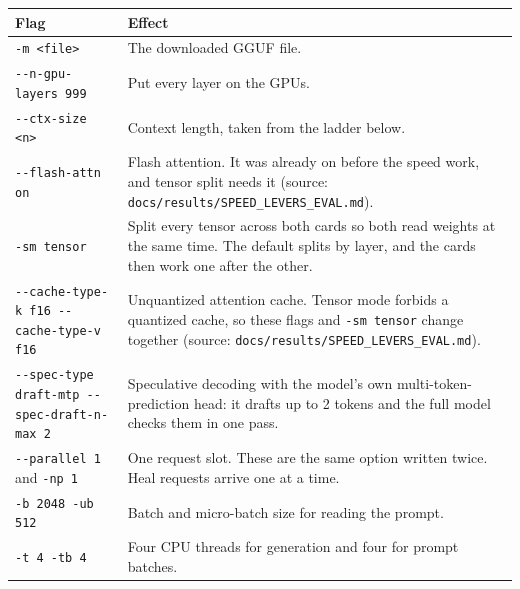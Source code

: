 \documentclass[11pt,a4paper]{report}
\begin{document}
\begin{longtable}{>{\raggedright\arraybackslash}p{0.464\dimexpr\linewidth-4\tabcolsep\relax}>{\raggedright\arraybackslash}p{0.536\dimexpr\linewidth-4\tabcolsep\relax}}
\toprule
\textbf{Flag} & \textbf{Effect} \\
\midrule
\endhead
\texttt{-\allowbreak{}m \textless{}file\textgreater{}} & The downloaded GGUF file. \\
\texttt{-\allowbreak{}-\allowbreak{}n-\allowbreak{}gpu-\allowbreak{}layers 999} & Put every layer on the GPUs. \\
\texttt{-\allowbreak{}-\allowbreak{}ctx-\allowbreak{}size \textless{}n\textgreater{}} & Context length, taken from the ladder below. \\
\texttt{-\allowbreak{}-\allowbreak{}flash-\allowbreak{}attn on} & Flash attention. It was already on before the speed work, and tensor split needs it (source: \texttt{docs/\allowbreak{}results/\allowbreak{}SPEED\_\allowbreak{}LEVERS\_\allowbreak{}EVAL.\allowbreak{}md}). \\
\texttt{-\allowbreak{}sm tensor} & Split every tensor across both cards so both read weights at the same time. The default splits by layer, and the cards then work one after the other. \\
\texttt{-\allowbreak{}-\allowbreak{}cache-\allowbreak{}type-\allowbreak{}k f16 -\allowbreak{}-\allowbreak{}cache-\allowbreak{}type-\allowbreak{}v f16} & Unquantized attention cache. Tensor mode forbids a quantized cache, so these flags and \texttt{-\allowbreak{}sm tensor} change together (source: \texttt{docs/\allowbreak{}results/\allowbreak{}SPEED\_\allowbreak{}LEVERS\_\allowbreak{}EVAL.\allowbreak{}md}). \\
\texttt{-\allowbreak{}-\allowbreak{}spec-\allowbreak{}type draft-\allowbreak{}mtp -\allowbreak{}-\allowbreak{}spec-\allowbreak{}draft-\allowbreak{}n-\allowbreak{}max 2} & Speculative decoding with the model's own multi-token-prediction head: it drafts up to 2 tokens and the full model checks them in one pass. \\
\texttt{-\allowbreak{}-\allowbreak{}parallel 1} and \texttt{-\allowbreak{}np 1} & One request slot. These are the same option written twice. Heal requests arrive one at a time. \\
\texttt{-\allowbreak{}b 2048 -\allowbreak{}ub 512} & Batch and micro-batch size for reading the prompt. \\
\texttt{-\allowbreak{}t 4 -\allowbreak{}tb 4} & Four CPU threads for generation and four for prompt batches. \\

\end{longtable}
\end{document}
